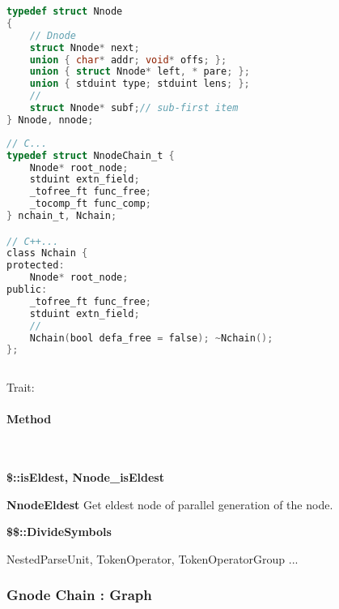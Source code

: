 \lstset{style=GlobalC}
\begin{lstlisting}[language=C]
typedef struct Nnode
{
	// Dnode
	struct Nnode* next;
	union { char* addr; void* offs; };
	union { struct Nnode* left, * pare; };
	union { stduint type; stduint lens; };
	//
	struct Nnode* subf;// sub-first item
} Nnode, nnode;
\end{lstlisting}

\lstset{style=GlobalC}
\begin{lstlisting}[language=C]
// C...
typedef struct NnodeChain_t {
	Nnode* root_node;
	stduint extn_field;
	_tofree_ft func_free;
	_tocomp_ft func_comp;
} nchain_t, Nchain;

// C++...
class Nchain {
protected:
	Nnode* root_node;
public:
	_tofree_ft func_free;
	stduint extn_field;
	//
	Nchain(bool defa_free = false); ~Nchain();
};
	
\end{lstlisting}

Trait:  

\paragraph{Method} \


\textbf{\$::isEldest, Nnode\_isEldest}

\textbf{NnodeEldest}
Get eldest node of parallel generation of the node.

\textbf{\$\$::DivideSymbols}

NestedParseUnit, TokenOperator, TokenOperatorGroup ...

\subsubsection{Gnode Chain : Graph}


